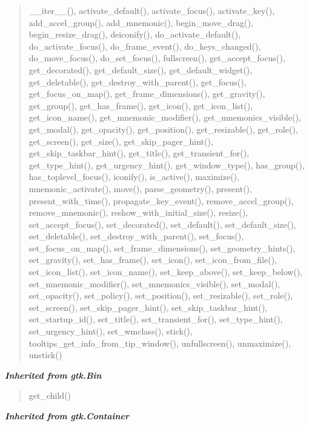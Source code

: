 \begin{quote}
\_\_iter\_\_(), activate\_default(), activate\_focus(), activate\_key(), add\_accel\_group(), add\_mnemonic(), begin\_move\_drag(), begin\_resize\_drag(), deiconify(), do\_activate\_default(), do\_activate\_focus(), do\_frame\_event(), do\_keys\_changed(), do\_move\_focus(), do\_set\_focus(), fullscreen(), get\_accept\_focus(), get\_decorated(), get\_default\_size(), get\_default\_widget(), get\_deletable(), get\_destroy\_with\_parent(), get\_focus(), get\_focus\_on\_map(), get\_frame\_dimensions(), get\_gravity(), get\_group(), get\_has\_frame(), get\_icon(), get\_icon\_list(), get\_icon\_name(), get\_mnemonic\_modifier(), get\_mnemonics\_visible(), get\_modal(), get\_opacity(), get\_position(), get\_resizable(), get\_role(), get\_screen(), get\_size(), get\_skip\_pager\_hint(), get\_skip\_taskbar\_hint(), get\_title(), get\_transient\_for(), get\_type\_hint(), get\_urgency\_hint(), get\_window\_type(), has\_group(), has\_toplevel\_focus(), iconify(), is\_active(), maximize(), mnemonic\_activate(), move(), parse\_geometry(), present(), present\_with\_time(), propagate\_key\_event(), remove\_accel\_group(), remove\_mnemonic(), reshow\_with\_initial\_size(), resize(), set\_accept\_focus(), set\_decorated(), set\_default(), set\_default\_size(), set\_deletable(), set\_destroy\_with\_parent(), set\_focus(), set\_focus\_on\_map(), set\_frame\_dimensions(), set\_geometry\_hints(), set\_gravity(), set\_has\_frame(), set\_icon(), set\_icon\_from\_file(), set\_icon\_list(), set\_icon\_name(), set\_keep\_above(), set\_keep\_below(), set\_mnemonic\_modifier(), set\_mnemonics\_visible(), set\_modal(), set\_opacity(), set\_policy(), set\_position(), set\_resizable(), set\_role(), set\_screen(), set\_skip\_pager\_hint(), set\_skip\_taskbar\_hint(), set\_startup\_id(), set\_title(), set\_transient\_for(), set\_type\_hint(), set\_urgency\_hint(), set\_wmclass(), stick(), tooltips\_get\_info\_from\_tip\_window(), unfullscreen(), unmaximize(), unstick()
\end{quote}

\large{\textbf{\textit{Inherited from gtk.Bin}}}

\begin{quote}
get\_child()
\end{quote}

\large{\textbf{\textit{Inherited from gtk.Container}}}

